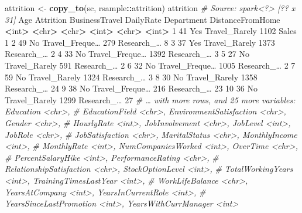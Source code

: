 \documentclass[
]{article}
\newenvironment{Shaded}{\begin{snugshade}}{\end{snugshade}}
\newcommand{\CommentTok}[1]{\textcolor[rgb]{0.56,0.35,0.01}{\textit{#1}}}
\newcommand{\DecValTok}[1]{\textcolor[rgb]{0.00,0.00,0.81}{#1}}
\newcommand{\ErrorTok}[1]{\textcolor[rgb]{0.64,0.00,0.00}{\textbf{#1}}}
\newcommand{\KeywordTok}[1]{\textcolor[rgb]{0.13,0.29,0.53}{\textbf{#1}}}
\newcommand{\NormalTok}[1]{#1}
\newcommand{\OperatorTok}[1]{\textcolor[rgb]{0.81,0.36,0.00}{\textbf{#1}}}
\newcommand{\StringTok}[1]{\textcolor[rgb]{0.31,0.60,0.02}{#1}}
\begin{document}
\begin{Shaded}
\begin{Highlighting}[]
\NormalTok{attrition <-}\StringTok{ }\KeywordTok{copy_to}\NormalTok{(sc, rsample}\OperatorTok{::}\NormalTok{attrition)}
\NormalTok{attrition}
\CommentTok{# Source: spark<?> [?? x 31]}
\NormalTok{ Age Attrition BusinessTravel DailyRate Department DistanceFromHome}
 \OperatorTok{<}\NormalTok{int}\OperatorTok{>}\StringTok{ }\ErrorTok{<}\NormalTok{chr}\OperatorTok{>}\StringTok{ }\ErrorTok{<}\NormalTok{chr}\OperatorTok{>}\StringTok{ }\ErrorTok{<}\NormalTok{int}\OperatorTok{>}\StringTok{ }\ErrorTok{<}\NormalTok{chr}\OperatorTok{>}\StringTok{ }\ErrorTok{<}\NormalTok{int}\OperatorTok{>}
\StringTok{ }\DecValTok{1} \DecValTok{41}\NormalTok{ Yes Travel_Rarely }\DecValTok{1102}\NormalTok{ Sales }\DecValTok{1}
 \DecValTok{2} \DecValTok{49}\NormalTok{ No Travel_Freque… }\DecValTok{279}\NormalTok{ Research_… }\DecValTok{8}
 \DecValTok{3} \DecValTok{37}\NormalTok{ Yes Travel_Rarely }\DecValTok{1373}\NormalTok{ Research_… }\DecValTok{2}
 \DecValTok{4} \DecValTok{33}\NormalTok{ No Travel_Freque… }\DecValTok{1392}\NormalTok{ Research_… }\DecValTok{3}
 \DecValTok{5} \DecValTok{27}\NormalTok{ No Travel_Rarely }\DecValTok{591}\NormalTok{ Research_… }\DecValTok{2}
 \DecValTok{6} \DecValTok{32}\NormalTok{ No Travel_Freque… }\DecValTok{1005}\NormalTok{ Research_… }\DecValTok{2}
 \DecValTok{7} \DecValTok{59}\NormalTok{ No Travel_Rarely }\DecValTok{1324}\NormalTok{ Research_… }\DecValTok{3}
 \DecValTok{8} \DecValTok{30}\NormalTok{ No Travel_Rarely }\DecValTok{1358}\NormalTok{ Research_… }\DecValTok{24}
 \DecValTok{9} \DecValTok{38}\NormalTok{ No Travel_Freque… }\DecValTok{216}\NormalTok{ Research_… }\DecValTok{23}
\DecValTok{10} \DecValTok{36}\NormalTok{ No Travel_Rarely }\DecValTok{1299}\NormalTok{ Research_… }\DecValTok{27}
\CommentTok{# … with more rows, and 25 more variables: Education <chr>,}
\CommentTok{# EducationField <chr>, EnvironmentSatisfaction <chr>, Gender <chr>,}
\CommentTok{# HourlyRate <int>, JobInvolvement <chr>, JobLevel <int>, JobRole <chr>,}
\CommentTok{# JobSatisfaction <chr>, MaritalStatus <chr>, MonthlyIncome <int>,}
\CommentTok{# MonthlyRate <int>, NumCompaniesWorked <int>, OverTime <chr>,}
\CommentTok{# PercentSalaryHike <int>, PerformanceRating <chr>,}
\CommentTok{# RelationshipSatisfaction <chr>, StockOptionLevel <int>,}
\CommentTok{# TotalWorkingYears <int>, TrainingTimesLastYear <int>,}
\CommentTok{# WorkLifeBalance <chr>, YearsAtCompany <int>, YearsInCurrentRole <int>,}
\CommentTok{# YearsSinceLastPromotion <int>, YearsWithCurrManager <int>}
\end{Highlighting}
\end{Shaded}
\end{document}
